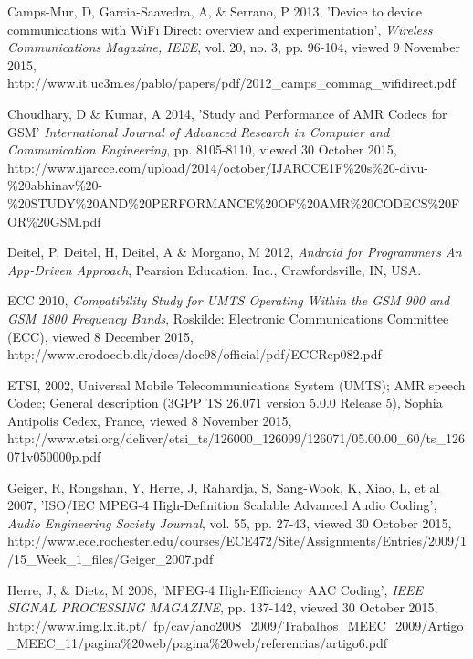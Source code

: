 \documentclass[12pt,svgnames,smaller]{article} %
\begin{document}
\begin{thebibliography}{ 10 }
		
		Camps-Mur, D, Garcia-Saavedra, A, \& Serrano, P 2013, 'Device to device communications with WiFi Direct: overview and experimentation', \emph{Wireless Communications Magazine, IEEE}, vol. 20, no. 3, pp. 96-104, viewed 9 November 2015, http://www.it.uc3m.es/pablo/papers/pdf/2012\_camps\_commag\_wifidirect.pdf
		
		
		Choudhary, D \& Kumar, A 2014, 'Study and Performance of AMR Codecs for GSM' \emph{International Journal of Advanced Research in Computer and Communication Engineering}, pp. 8105-8110, viewed 30 October 2015, http://www.ijarcce.com/upload/2014/october/IJARCCE1F\%20s\%20-divu-\%20abhinav\%20-\%20STUDY\%20AND\%20PERFORMANCE\%20OF\%20AMR\%20CODECS\%20FOR\%20GSM.pdf
		
		
		Deitel, P, Deitel, H, Deitel, A \& Morgano, M 2012, \emph{Android for Programmers An App-Driven Approach}, Pearsion Education, Inc., Crawfordsville, IN, USA.
		
		
		ECC 2010, \emph{Compatibility Study for UMTS Operating Within the GSM 900 and GSM 1800 Frequency Bands}, Roskilde: Electronic Communications Committee (ECC), viewed 8 December 2015, http://www.erodocdb.dk/docs/doc98/official/pdf/ECCRep082.pdf
		
		
		ETSI, 2002, Universal Mobile Telecommunications System (UMTS); AMR speech Codec; General description (3GPP TS 26.071 version 5.0.0 Release 5), Sophia Antipolis Cedex, France, viewed 8 November 2015, http://www.etsi.org/deliver/etsi\_ts/126000\_126099/126071/05.00.00\_60/ts\_126071v050000p.pdf 
		
		
		Geiger, R, Rongshan, Y, Herre, J, Rahardja, S, Sang-Wook, K, Xiao, L, et al 2007, 'ISO/IEC MPEG-4 High-Definition Scalable Advanced Audio Coding', \emph{Audio Engineering Society Journal}, vol. 55, pp. 27-43, viewed 30 October 2015, http://www.ece.rochester.edu/courses/ECE472/Site/Assignments/Entries/2009/1/15\_Week\_1\_files/Geiger\_2007.pdf
		
		
		Herre, J, \& Dietz, M 2008, 'MPEG-4 High-Efficiency AAC Coding', \emph{IEEE SIGNAL PROCESSING MAGAZINE}, pp. 137-142, viewed 30 October 2015, http://www.img.lx.it.pt/~fp/cav/ano2008\_2009/Trabalhos\_MEEC\_2009/Artigo\_MEEC\_11/pagina\%20web/pagina\%20web/referencias/artigo6.pdf
		

\end{thebibliography}
\end{document}
